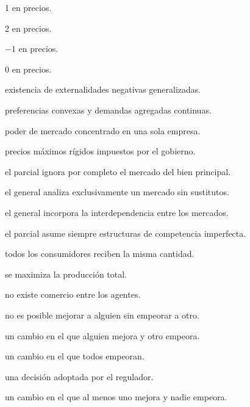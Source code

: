\begin{opts}
    \item 1 en precios.
    \item 2 en precios.
    \item $-1$ en precios.
    \item 0 en precios.
\end{opts}

\begin{opts}
    \item existencia de externalidades negativas generalizadas.
    \item preferencias convexas y demandas agregadas continuas.
    \item poder de mercado concentrado en una sola empresa.
    \item precios máximos rígidos impuestos por el gobierno.
\end{opts}

\begin{opts}
    \item el parcial ignora por completo el mercado del bien principal.
    \item el general analiza exclusivamente un mercado sin sustitutos.
    \item el general incorpora la interdependencia entre los mercados.
    \item el parcial asume siempre estructuras de competencia imperfecta.
\end{opts}

\begin{opts}
    \item todos los consumidores reciben la misma cantidad.
    \item se maximiza la producción total.
    \item no existe comercio entre los agentes.
    \item no es posible mejorar a alguien sin empeorar a otro.
\end{opts}

\begin{opts}
    \item un cambio en el que alguien mejora y otro empeora.
    \item un cambio en el que todos empeoran.
    \item una decisión adoptada por el regulador.
    \item un cambio en el que al menos uno mejora y nadie empeora.
\end{opts}

